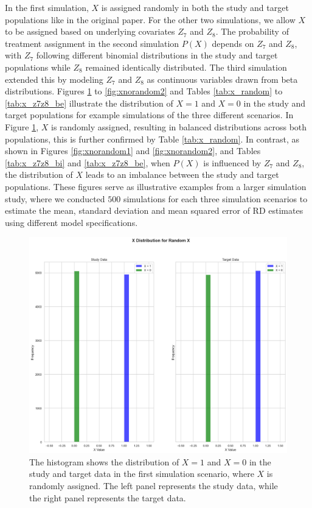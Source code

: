 \documentclass[12pt,oneside]{amsart}
\theoremstyle{definition}
\theoremstyle{remark}
\numberwithin{equation}{section}
\begin{document}
In the first simulation, $X$ is assigned randomly in both the study and target populations like in the original paper.  For the other two simulations, we allow $X$ to be assigned based on underlying covariates $Z_7$ and $Z_8$. The probability of treatment assignment in the second simulation $P(X)$ depends on $Z_7$ and $Z_8$, with $Z_7$ following different binomial distributions in the study and target populations while $Z_8$ remained identically distributed. The third simulation extended this by modeling $Z_7$ and $Z_8$ as continuous variables drawn from beta distributions. Figures \ref{fig:xrandom} to \ref{fig:xnorandom2} and Tables \ref{tab:x_random} to \ref{tab:x_z7z8_be} illustrate the distribution of $X=1$ and $X=0$ in the study and target populations for example simulations of the three different scenarios. In Figure \ref{fig:xrandom}, $X$ is randomly assigned, resulting in balanced distributions across both populations, this is further confirmed by Table \ref{tab:x_random}. In contrast, as shown in Figures \ref{fig:xnorandom1} and \ref{fig:xnorandom2}, and Tables \ref{tab:x_z7z8_bi} and \ref{tab:x_z7z8_be}, when $P(X)$ is influenced by $Z_7$ and $Z_8$, the distribution of $X$ leads to an imbalance between the study and target populations. These figures serve as illustrative examples from a larger simulation study, where we conducted $500$ simulations for each three simulation scenarios to estimate the mean, standard deviation and mean squared error of RD estimates using different model specifications.

\begin{figure}[!h]
    \centering
    \includegraphics[width=0.5\linewidth]{Report/Figure/xrandom.jpg}
    \caption{The histogram shows the distribution of $X=1$ and $X=0$ in the study and target data in the first simulation scenario, where $X$ is randomly assigned. The left panel represents the study data, while the right panel represents the target data.}
    \label{fig:xrandom}
\end{figure}
\end{document}
